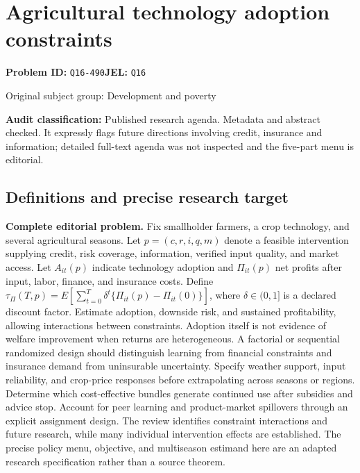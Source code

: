 \documentclass[11pt,a4paper]{article}
\begin{document}
\section*{Agricultural technology adoption constraints}
\textbf{Problem ID:} \texttt{Q16-490}\quad \textbf{JEL:} \texttt{Q16}\par
\label{problem:OP-0377}
\label{audited:ECON-093}
{\sffamily\small\color{muted}Original subject group: Development and poverty\par}
\label{definitions:problem:30007659}
\textbf{Audit classification:} Published research agenda. Metadata and abstract checked. It expressly flags future directions involving credit, insurance and information; detailed full-text agenda was not inspected and the five-part menu is editorial.
\subsection*{Definitions and precise research target}
\textbf{Complete editorial problem.} Fix smallholder farmers, a crop technology, and several agricultural seasons. Let \(p=(c,r,i,q,m)\) denote a feasible intervention supplying credit, risk coverage, information, verified input quality, and market access. Let \(A_{it}(p)\) indicate technology adoption and \(\Pi_{it}(p)\) net profits after input, labor, finance, and insurance costs. Define \(\tau_\Pi(T,p)=E[\sum_{t=0}^{T}\delta^t\{\Pi_{it}(p)-\Pi_{it}(0)\}]\), where \(\delta\in(0,1]\) is a declared discount factor. Estimate adoption, downside risk, and sustained profitability, allowing interactions between constraints. Adoption itself is not evidence of welfare improvement when returns are heterogeneous. A factorial or sequential randomized design should distinguish learning from financial constraints and insurance demand from uninsurable uncertainty. Specify weather support, input reliability, and crop-price responses before extrapolating across seasons or regions. Determine which cost-effective bundles generate continued use after subsidies and advice stop. Account for peer learning and product-market spillovers through an explicit assignment design. The review identifies constraint interactions and future research, while many individual intervention effects are established. The precise policy menu, objective, and multiseason estimand here are an adapted research specification rather than a source theorem.
\end{document}

